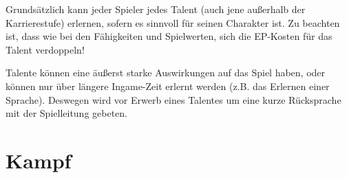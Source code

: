 \documentclass[a4paper,10pt,twoside,twocolumn,openany,bg=none]{dndbook}
\begin{document}
\noindent
Grundsätzlich kann jeder Spieler jedes Talent (auch jene außerhalb der Karrierestufe) erlernen, sofern es sinnvoll für seinen Charakter ist. Zu beachten ist, dass wie bei den Fähigkeiten und Spielwerten, sich die EP-Kosten für das Talent verdoppeln!

\vspace{1ex}
\noindent
Talente können eine äußerst starke Auswirkungen auf das Spiel haben, oder können nur über längere Ingame-Zeit erlernt werden (z.B. das Erlernen einer Sprache). 
Deswegen wird vor Erwerb eines Talentes um eine kurze Rücksprache mit der Spielleitung gebeten.






\section{Kampf}
\end{document}
